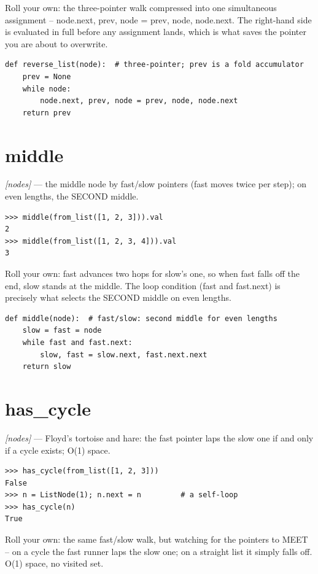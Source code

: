 \documentclass[11pt,letterpaper]{book}
\begin{document}
Roll your own: the three-pointer walk compressed into one simultaneous assignment -- node.next, prev, node = prev, node, node.next. The right-hand side is evaluated in full before any assignment lands, which is what saves the pointer you are about to overwrite.

\begin{lstlisting}[style=code]
def reverse_list(node):  # three-pointer; prev is a fold accumulator
    prev = None
    while node:
        node.next, prev, node = prev, node, node.next
    return prev
\end{lstlisting}

\section{middle}
\noindent\textit{[nodes]} --- the middle node by fast/slow pointers (fast moves twice per step); on even lengths, the SECOND middle.
\begin{lstlisting}[style=spec]
>>> middle(from_list([1, 2, 3])).val
2
>>> middle(from_list([1, 2, 3, 4])).val
3
\end{lstlisting}

Roll your own: fast advances two hops for slow's one, so when fast falls off the end, slow stands at the middle. The loop condition (fast and fast.next) is precisely what selects the SECOND middle on even lengths.

\begin{lstlisting}[style=code]
def middle(node):  # fast/slow: second middle for even lengths
    slow = fast = node
    while fast and fast.next:
        slow, fast = slow.next, fast.next.next
    return slow
\end{lstlisting}

\section{has\_cycle}
\noindent\textit{[nodes]} --- Floyd's tortoise and hare: the fast pointer laps the slow one if and only if a cycle exists; O(1) space.
\begin{lstlisting}[style=spec]
>>> has_cycle(from_list([1, 2, 3]))
False
>>> n = ListNode(1); n.next = n         # a self-loop
>>> has_cycle(n)
True
\end{lstlisting}

Roll your own: the same fast/slow walk, but watching for the pointers to MEET -- on a cycle the fast runner laps the slow one; on a straight list it simply falls off. O(1) space, no visited set.
\end{document}
